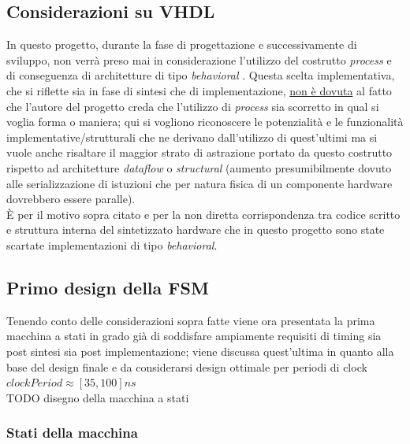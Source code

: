 \documentclass[11pt,a4paper]{article}
\begin{document}
        \subsection{Considerazioni su VHDL}
            In questo progetto, durante la fase di progettazione e successivamente di sviluppo, non verrà preso mai in considerazione l'utilizzo del costrutto \textit{process} e di conseguenza
             di architetture di tipo \textit{behavioral} . Questa scelta implementativa, che si riflette sia in fase di sintesi che di implementazione, \underline{non è dovuta} al fatto che l'autore 
             del progetto creda che l'utilizzo di \textit{process} sia scorretto in qual si voglia forma o maniera; qui si vogliono riconoscere le potenzialità e le funzionalità implementative/strutturali 
             che ne derivano dall'utilizzo di quest'ultimi ma si vuole anche risaltare il maggior strato di astrazione portato da questo costrutto rispetto ad architetture \textit{dataflow} o \textit{structural} (aumento presumibilmente
             dovuto alle serializzazione di istuzioni che per natura fisica di un componente hardware dovrebbero essere paralle).\\
            È per il motivo sopra citato e per la non diretta corrispondenza tra codice scritto e struttura interna del sintetizzato hardware che in questo progetto sono state scartate implementazioni di tipo \textit{behavioral}.
        \subsection{Primo design della FSM}
            Tenendo conto delle considerazioni sopra fatte viene ora presentata la prima macchina a stati in grado già di soddisfare ampiamente requisiti di timing sia post sintesi sia post implementazione; viene discussa quest'ultima in 
            quanto alla base del design finale e da considerarsi design ottimale per periodi di clock $clockPeriod \approx [35,100] ns$\\
            TODO disegno della macchina a stati 
            \subsubsection{Stati della macchina}
            
\end{document}
